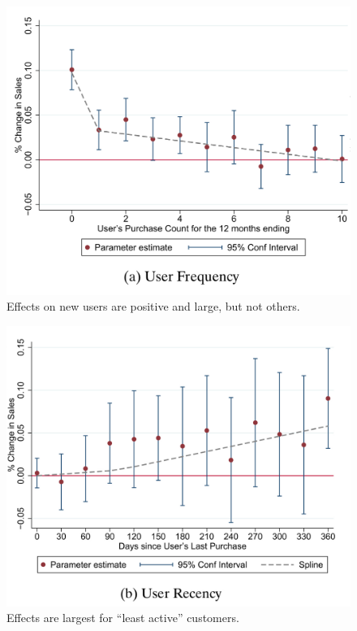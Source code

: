 \documentclass{beamer}
\begin{document}
\begin{frame}

\begin{figure}
\begin{center}
\includegraphics[scale=0.2]{./lecture_includes/tadelis_newuser_fig1.png}
\caption{Effects on new users are positive and large, but not others. }
\end{center}
\end{figure}

\end{frame}

\begin{frame}

\begin{figure}
\begin{center}
\includegraphics[scale=0.2]{./lecture_includes/tadelis_newuser_fig2.png}
\caption{Effects are largest for ``least active'' customers. }
\end{center}
\end{figure}

\end{frame}
\end{document}
